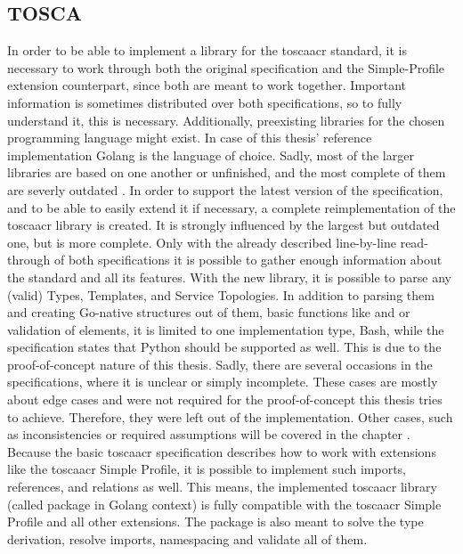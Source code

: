 \subsection{TOSCA}
In order to be able to implement a library for the \gls{toscaacr} standard, it is necessary to work through both the original specification and the Simple-Profile extension counterpart, since both are meant to work together. Important information is sometimes distributed over both specifications, so to fully understand it, this is necessary. Additionally, preexisting libraries for the chosen programming language might exist. In case of this thesis' reference implementation Golang is the language of choice. Sadly, most of the larger libraries are based on one another or unfinished, and the most complete of them are severly outdated \cite{github_toscalib_forks}.
\newline
In order to support the latest version of the specification, and to be able to easily extend it if necessary, a complete reimplementation of the \gls{toscaacr} library is created. It is strongly influenced by the largest but outdated one, but is more complete. Only with the already described line-by-line read-through of both specifications it is possible to gather enough information about the standard and all its features.
\newline
With the new library, it is possible to parse any (valid) Types, Templates, and Service Topologies.
In addition to parsing them and creating Go-native structures out of them, basic functions like  and  or validation of elements, it is limited to one implementation type, Bash, while the specification states that Python should be supported as well. This is due to the proof-of-concept nature of this thesis. Sadly, there are several occasions in the specifications, where it is unclear or simply incomplete. These cases are mostly about edge cases and were not required for the proof-of-concept this thesis tries to achieve. Therefore, they were left out of the implementation. Other cases, such as inconsistencies or required assumptions will be covered in the chapter .
\newline
Because the basic \gls{toscaacr} specification describes how to work with extensions like the \gls{toscaacr} Simple Profile, it is possible to implement such imports, references, and relations as well. This means, the implemented \gls{toscaacr} library (called package in Golang context) is fully compatible with the \gls{toscaacr} Simple Profile and all other extensions.
\newline
The package is also meant to solve the type derivation, resolve imports, namespacing and validate all of them.

